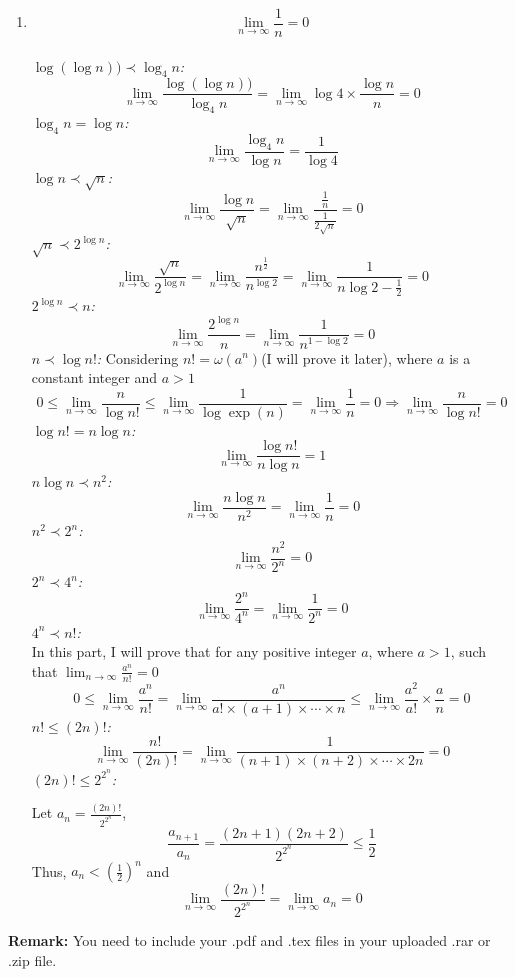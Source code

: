 \documentclass[12pt,a4paper]{article}
\makeatletter
\newtheorem*{solution}{Solution}
\theoremstyle{definition}
\renewenvironment{solution}[1][Solution] {\par\pushQED{\qed}\normalfont\topsep6\p@\@plus6\p@\relax\trivlist\item[\hskip\labelsep\bfseries#1\@addpunct{.}]\ignorespaces}{\popQED\endtrivlist\@endpefalse} \makeatother
\makeatother
\begin{document}
\begin{enumerate}
\begin{solution}
    $$\lim_{n\rightarrow\infty} \frac{1}{n}=0$$\\
    \textit{$\log (\log n)) \prec \log_4 n$:}
    $$\lim_{n\rightarrow\infty} \frac{\log (\log n))}{\log_4 n}=\lim_{n\rightarrow\infty} \log 4 \times \frac{\log n}{n}=0 $$
    \textit{$\log_4 n = \log n$:}\\
    $$\lim_{n\rightarrow\infty} \frac{\log_4 n}{\log n}=\frac{1}{\log 4}$$
    \textit{$\log n \prec \sqrt{n}$:}\\
    $$\lim_{n\rightarrow\infty} \frac{\log n}{\sqrt{n}}=\lim_{n\rightarrow\infty} \frac{\frac{1}{n}}{\frac{1}{2\sqrt{n}}}=0$$
    \textit{$\sqrt{n} \prec 2^{\log n}$:} \\
    $$\lim_{n\rightarrow\infty} \frac{\sqrt{n}}{2^{\log n}}=\lim_{n\rightarrow\infty} \frac{n^{\frac{1}{2}}}{n^{\log 2}}=\lim_{n\rightarrow\infty} \frac{1}{n{\log 2-\frac{1}{2}}}=0$$
  	\textit{$2^{\log n}\prec n$:}
  	$$\lim_{n\rightarrow\infty} \frac{2^{\log n}}{n}=\lim_{n\rightarrow\infty}\frac{1}{n^{1-\log 2}}=0$$
   	\textit{$n \prec \log n!$:} Considering $n!=\omega(a^n)$(I will prove it later), where $a$ is a constant integer and $a>1$ \\
   	$$0\leq \lim_{n\rightarrow\infty} \frac{n}{\log n!}\leq \lim_{n\rightarrow\infty} \frac{1}{\log \exp(n)}=\lim_{n\rightarrow\infty} \frac{1}{n}=0 \Rightarrow \lim_{n\rightarrow\infty} \frac{n}{\log n!} =0$$
  	\textit{$\log n! = n\log n$: }
	$$\lim_{n\rightarrow\infty} \frac{\log n!}{n\log n} =1$$
	\textit{$n\log n \prec n^2$:}
	$$\lim_{n\rightarrow\infty} \frac{n\log n}{n^2}=\lim_{n\rightarrow\infty} \frac{1}{n}=0$$
	\textit{$n^2 	\prec 2^{n}$:}
	$$\lim_{n\rightarrow\infty} \frac{n^2}{2^{n}}=0$$
	\textit{$2^n\prec 4^n$:}
	$$\lim_{n\rightarrow\infty} \frac{2^n}{4^n}=\lim_{n\rightarrow\infty} \frac{1}{2^n}=0$$
	\textit{$4^n\prec n!$:} \\In this part, I will prove that for any positive integer $a$, where $a>1$, such that $\lim_{n\rightarrow\infty} \frac{a^n}{n!}=0$ 
	$$0\leq \lim_{n\rightarrow\infty} \frac{a^n}{n!}=\lim_{n\rightarrow\infty} \frac{a^n}{a!\times (a+1)\times \cdots \times n} \leq \lim_{n\rightarrow\infty}\frac{a^2}{a!}\times \frac{a}{n}=0$$
	\textit{$n!\leq (2n)!$:}
	$$\lim_{n\rightarrow\infty} \frac{n!}{(2n)!}=\lim_{n\rightarrow\infty} \frac{1}{(n+1)\times(n+2)\times \cdots	\times 2n}=0$$
	\textit{$(2n)!\leq 2^{2^n}$:}
	
	Let $a_n=\frac{(2n)!}{2^{2^n}}$,
	$$\frac{a_{n+1}}{a_n}=\frac{(2n+1)(2n+2)}{2^{2^{n}}}\leq \frac{1}{2}$$
	Thus, $a_n<(\frac{1}{2})^n$ and 
	$$\lim_{n\rightarrow\infty} \frac{(2n)!}{2^{2^n}}=\lim_{n\rightarrow\infty} a_n=0$$
    \end{solution}


\end{enumerate}

\vspace{20pt}

\textbf{Remark:} You need to include your .pdf and .tex files in your uploaded .rar or .zip file.

\end{document}
